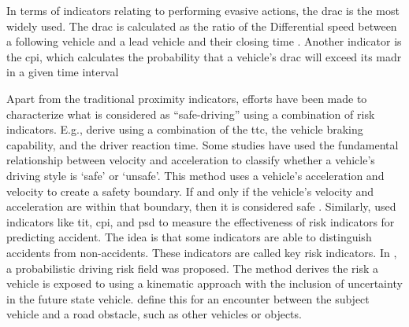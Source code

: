 In terms of indicators relating to performing evasive actions, the \ac{drac} is the most widely used. 
The \ac{drac} is calculated as the ratio of the Differential speed between a following vehicle and a lead vehicle and their closing time \autocite{almqvist1991use, mahmud2017application}. 
Another indicator is the \ac{cpi}, which calculates the probability that a vehicle's \ac{drac} will exceed its \ac{madr} in a given time interval \autocite{cunto2009simulated} 


Apart from the traditional proximity indicators, efforts have been made to characterize what is considered as ``safe-driving'' using a combination of risk indicators.
E.g., \textcite{wang2014evaluation} derive  using a combination of the \ac{ttc}, the vehicle braking capability, and the driver reaction time.
Some studies have used the fundamental relationship between velocity and acceleration to classify whether a vehicle’s driving style  is `safe' or `unsafe'. 
This method uses a vehicle's acceleration and velocity to create a safety boundary.
If and only if the vehicle's velocity and acceleration are within that boundary, then it is considered safe  \autocite{eboli2016combining}.
Similarly, \autocite{shi2018key} used indicators like \ac{tit}, \ac{cpi}, and \ac{psd} to measure the effectiveness of risk indicators for predicting accident. 
The idea is that some indicators are able to distinguish accidents from non-accidents. These indicators are called key risk indicators. 
In \autocite{mullakkal2020modelling}, a probabilistic driving risk field was proposed.
The method derives the risk a vehicle is exposed to using a kinematic approach with the inclusion of uncertainty in the future state vehicle. 
\textcite{mullakkal2020modelling} define this for an encounter between the subject vehicle and a road obstacle, such as other vehicles or objects. 
